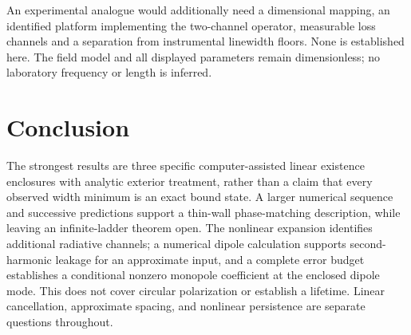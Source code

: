 \documentclass[a4paper,11pt]{article}
\begin{document}
An experimental analogue would additionally need a dimensional mapping,
an identified platform implementing the two-channel operator, measurable
loss channels and a separation from instrumental linewidth floors. None
is established here. The field model and all displayed parameters remain
dimensionless; no laboratory frequency or length is inferred.

\section{Conclusion}
The strongest results are three specific computer-assisted linear
existence enclosures with analytic exterior treatment, rather than a
claim that every observed width minimum is an exact bound state. A larger
numerical sequence and successive predictions support a thin-wall
phase-matching description, while leaving an infinite-ladder theorem
open. The nonlinear expansion identifies additional radiative channels;
a numerical dipole calculation supports second-harmonic leakage for an
approximate input, and a complete error budget establishes a conditional
nonzero monopole coefficient at the enclosed dipole mode. This does not
cover circular polarization or establish a lifetime. Linear cancellation, approximate
spacing, and nonlinear persistence are separate questions throughout.

\appendix

\clearpage

\clearpage
\end{document}
